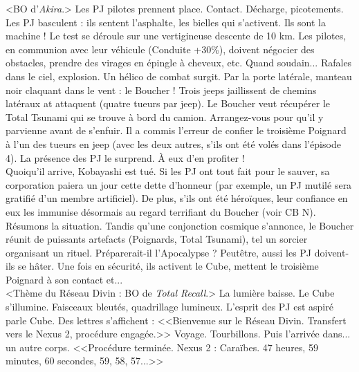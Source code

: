 \documentclass[11pt,twoside,a4paper]{book}
\begin{document}
<BO d'\emph{Akira}.> Les PJ pilotes prennent place. Contact. D{\'e}charge, picotements. Les PJ basculent : ils sentent l'asphalte, les bielles qui s'activent. Ils sont la machine ! Le test se d{\'e}roule sur une vertigineuse descente de 10 km. Les pilotes, en communion avec leur v{\'e}hicule (Conduite +30\%), doivent n{\'e}gocier des obstacles, prendre des virages en {\'e}pingle {\`a} cheveux, etc. Quand soudain... Rafales dans le ciel, explosion. Un h{\'e}lico de combat surgit. Par la porte lat{\'e}rale, manteau noir claquant dans le vent : le Boucher ! Trois jeeps jaillissent de chemins lat{\'e}raux at attaquent (quatre tueurs par jeep). Le Boucher veut r{\'e}cup{\'e}rer le Total Tsunami qui se trouve {\`a} bord du camion. Arrangez-vous pour qu'il y parvienne avant de s'enfuir. Il a commis l'erreur de confier le troisi{\`e}me Poignard {\`a} l'un des tueurs en jeep (avec les deux autres, s'ils ont {\'e}t{\'e} vol{\'e}s dans l'{\'e}pisode 4). La pr{\'e}sence des PJ le surprend. {\`A} eux d'en profiter !~\\

Quoiqu'il arrive, Kobayashi est tu{\'e}. Si les PJ ont tout fait pour le sauver, sa corporation paiera un jour cette dette d'honneur (par exemple, un PJ mutil{\'e} sera gratifi{\'e} d'un membre artificiel). De plus, s'ils ont {\'e}t{\'e} h{\'e}ro{\"i}ques, leur confiance en eux les immunise d{\'e}sormais au regard terrifiant du Boucher (voir CB N). R{\'e}sumons la situation. Tandis qu'une conjonction cosmique s'annonce, le Boucher r{\'e}unit de puissants artefacts (Poignards, Total Tsunami), tel un sorcier organisant un rituel. Pr{\'e}parerait-il l'Apocalypse ? Peut{\^e}tre, aussi les PJ doivent-ils se h{\^a}ter. Une fois en s{\'e}curit{\'e}, ils activent le Cube, mettent le troisi{\`e}me Poignard {\`a} son contact et...~\\

<Th{\`e}me du R{\'e}seau Divin : BO de \emph{Total Recall}.> La lumi{\`e}re baisse. Le Cube s'illumine. Faisceaux bleut{\'e}s, quadrillage lumineux. L'esprit des PJ est aspir{\'e} parle Cube. Des lettres s'affichent : <<Bienvenue sur le R{\'e}seau Divin. Transfert vers le Nexus 2, proc{\'e}dure engag{\'e}e.>> Voyage. Tourbillons. Puis l'arriv{\'e}e dans... un autre corps. <<Proc{\'e}dure termin{\'e}e. Nexus 2 : Cara{\"i}bes. 47 heures, 59 minutes, 60 secondes, 59, 58, 57...>>~\\

\clearpage

\end{document}
